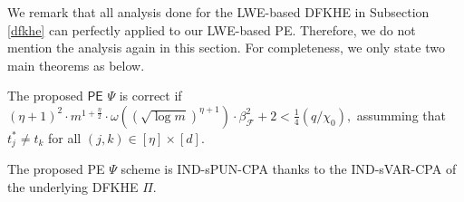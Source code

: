 \documentclass[runningheads,10pt]{llncs}
\begin{document}
We remark that all analysis done for the LWE-based DFKHE in Subsection \ref{dfkhe} can perfectly applied to our LWE-based PE. Therefore, we do not mention the analysis again in this section. For completeness, we only state two main theorems as below.
\begin{theorem} 
	The proposed $\mathsf{PE}$ $\Psi$ is correct 
	if 
			$(\eta+1)^2\cdot m^{1+\frac{\eta}{2}}\cdot \omega( (\sqrt{\log m})^{\eta+1})\cdot \beta_{\mathcal{F}}^2+2<\frac{1}{4}(q/\chi_0),$
 assumming   that $t^*_j \neq t_k$ for all $(j,k)\in [\eta]\times [d]$.
\end{theorem}
\begin{theorem} 
	The proposed PE $\Psi$ scheme is IND-sPUN-CPA thanks to the IND-sVAR-CPA of the underlying DFKHE $\Pi$.
\end{theorem}


\end{document}

